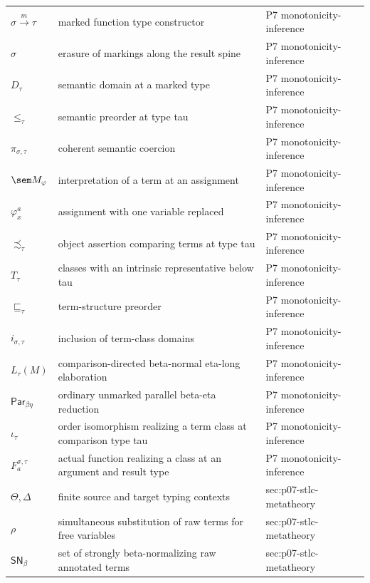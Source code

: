 \begin{longtable}{@{}p{}p{}p{}@{}}
\(\sigma\xrightarrow m\tau\) & marked function type constructor & P7 monotonicity-\allowbreak{}inference \\
\(\widehat\sigma\) & erasure of markings along the result spine & P7 monotonicity-\allowbreak{}inference \\
\(D_\tau\) & semantic domain at a marked type & P7 monotonicity-\allowbreak{}inference \\
\(\leq_\tau\) & semantic preorder at type tau & P7 monotonicity-\allowbreak{}inference \\
\(\pi_{\sigma,\tau}\) & coherent semantic coercion & P7 monotonicity-\allowbreak{}inference \\
\(\sem M_\varphi\) & interpretation of a term at an assignment & P7 monotonicity-\allowbreak{}inference \\
\(\varphi_x^a\) & assignment with one variable replaced & P7 monotonicity-\allowbreak{}inference \\
\(\precsim_\tau\) & object assertion comparing terms at type tau & P7 monotonicity-\allowbreak{}inference \\
\(T_\tau\) & classes with an intrinsic representative below tau & P7 monotonicity-\allowbreak{}inference \\
\(\sqsubseteq_\tau\) & term-structure preorder & P7 monotonicity-\allowbreak{}inference \\
\(i_{\sigma,\tau}\) & inclusion of term-class domains & P7 monotonicity-\allowbreak{}inference \\
\(L_\tau(M)\) & comparison-directed beta-normal eta-long elaboration & P7 monotonicity-\allowbreak{}inference \\
\(\mathsf{Par}_{\beta\eta}\) & ordinary unmarked parallel beta-eta reduction & P7 monotonicity-\allowbreak{}inference \\
\(\iota_\tau\) & order isomorphism realizing a term class at comparison type tau & P7 monotonicity-\allowbreak{}inference \\
\(F_a^{\sigma,\tau}\) & actual function realizing a class at an argument and result type & P7 monotonicity-\allowbreak{}inference \\
\(\Theta,\allowbreak \Delta\) & finite source and target typing contexts & sec:\allowbreak{}p07-\allowbreak{}stlc-\allowbreak{}metatheory \\
\(\rho\) & simultaneous substitution of raw terms for free variables & sec:\allowbreak{}p07-\allowbreak{}stlc-\allowbreak{}metatheory \\
\(\mathsf{SN}_\beta\) & set of strongly beta-normalizing raw annotated terms & sec:\allowbreak{}p07-\allowbreak{}stlc-\allowbreak{}metatheory \\

\end{longtable}
